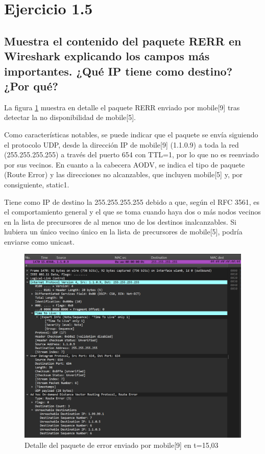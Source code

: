 \vspace{1.25cm}
\section{Ejercicio 1.5}

\subsection{Muestra el contenido del paquete RERR en Wireshark explicando los campos más importantes. ¿Qué IP
tiene como destino? ¿Por qué?}

La figura \ref{fig:RerrWireshark} muestra en detalle el paquete RERR enviado por mobile[9] tras detectar la no disponibilidad de mobile[5]. 

Como características notables, se puede indicar que el paquete se envía siguiendo el protocolo UDP, desde la dirección IP de mobile[9] (1.1.0.9) a toda la red (255.255.255.255) a través del puerto 654 con TTL=1, por lo que no es reenviado por sus vecinos. En cuanto a la cabecera AODV, se indica el tipo de paquete (Route Error) y las direcciones no alcanzables, que incluyen mobile[5] y, por consiguiente, static1.

Tiene como IP de destino la 255.255.255.255 debido a que, según el RFC 3561, es el comportamiento general y el que se toma cuando haya dos o más nodos vecinos en la lista de precursores de al menos uno de los destinos inalcanzables. Si hubiera un único vecino único en la lista de precursores de mobile[5], podría enviarse como unicast.

\begin{figure}[H]
    \centering
    \includegraphics[width=125mm, scale=0.75]{imaxes/ejercicio5_1.png}
    \caption{Detalle del paquete de error enviado por mobile[9] en t=15,03}
    \label{fig:RerrWireshark}
\end{figure}


